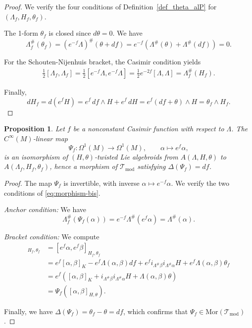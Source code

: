 \documentclass[11pt,a4paper]{article}
\theoremstyle{plain}
\newtheorem{proposition}[theorem]{Proposition}
\theoremstyle{definition}
\theoremstyle{remark}
\begin{document}
\begin{proof}
	We verify the four conditions of Definition~\ref{def_theta_alP} for $(\Lambda_f, H_f, \theta_f)$.
	
	The 1-form $\theta_f$ is closed since $d\theta = 0$. We have
	$$
	\Lambda_f^{\#}(\theta_f) = (e^{-f}\Lambda)^{\#}(\theta + df)
	= e^{-f}\left(\Lambda^{\#}(\theta) + \Lambda^{\#}(df)\right) = 0.
	$$
	
	For the Schouten-Nijenhuis bracket, the Casimir condition yields
	\begin{align*}
		\tfrac{1}{2}[\Lambda_f,\Lambda_f]
		= \tfrac{1}{2}[e^{-f}\Lambda, e^{-f}\Lambda] = \tfrac{1}{2}e^{-2f}[\Lambda, \Lambda] = \Lambda_f^{\#}(H_f).
	\end{align*}
	
	Finally,
	$$
	dH_f = d(e^f H) = e^f\,df \wedge H + e^f\,dH
	= e^f(df + \theta) \wedge H = \theta_f \wedge H_f.
	$$
\end{proof}

\begin{proposition}\label{thm:main}
	Let $f$ be a nonconstant Casimir function with respect to $\Lambda$. The $C^\infty(M)$-linear map
	$$
	\Psi_f : \Omega^1(M) \longrightarrow \Omega^1(M), \qquad \alpha \longmapsto e^f\alpha,
	$$
	is an isomorphism of $(H,\theta)$-twisted Lie algebroids from $A(\Lambda,H,\theta)$ to $A(\Lambda_f, H_f, \theta_f)$, hence a morphism  of $\mathcal{T}_{\mathrm{mod}}$ satisfying $\Delta(\Psi_f) = df$.
\end{proposition}

\begin{proof}
	The map $\Psi_f$ is  invertible, with inverse $\alpha\mapsto e^{-f}\alpha$. We verify the two conditions of \eqref{eq:morphism-bis}.
	
	\emph{Anchor condition:} We have
	$$
	\Lambda_f^\#(\Psi_f(\alpha)) = e^{-f}\Lambda^\#(e^f \alpha) = \Lambda^\#(\alpha).
	$$
	
	\emph{Bracket condition:} We compute
	\begin{align*}
		[\Psi_f(\alpha), \Psi_f(\beta)]_{H_f,\theta_f}
		&= [e^f\alpha, e^f\beta]_{H_f,\theta_f} \\
		&= e^f[\alpha,\beta]_{K} -e^f \Lambda(\alpha,\beta)df+ e^f i_{\Lambda^\#\beta}i_{\Lambda^\#\alpha}H + e^f \Lambda(\alpha,\beta)\theta_f \\
		&= e^f\left([\alpha,\beta]_{K} + i_{\Lambda^\#\beta}i_{\Lambda^\#\alpha}H + \Lambda(\alpha,\beta)\theta\right) \\
		&= \Psi_f([\alpha,\beta]_{H,\theta}).
	\end{align*}
	
	Finally, we have $\Delta(\Psi_f) = \theta_f - \theta = df$, which confirms that $\Psi_f \in \mathrm{Mor}(\mathcal{T}_{\mathrm{mod}})$.
\end{proof}
\end{document}
